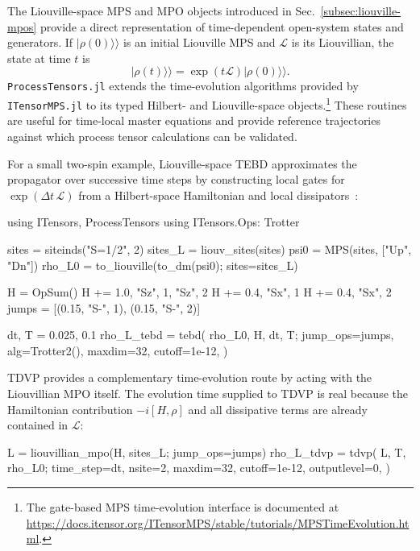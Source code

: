
\label{app:time-dynamics}

The Liouville-space MPS and MPO objects introduced in Sec.~\ref{subsec:liouville-mpos} provide a direct representation of time-dependent open-system states and generators.
If \(\lvert\rho(0)\rangle\!\rangle\) is an initial Liouville MPS and \(\mathcal L\) is its Liouvillian, the state at time \(t\) is
%
\begin{equation}
    \lvert\rho(t)\rangle\!\rangle
    = \exp(t\mathcal L)\lvert\rho(0)\rangle\!\rangle.
    \label{eq:appendix-liouville-time-evolution}
\end{equation}
%
\texttt{ProcessTensors.jl} extends the time-evolution algorithms provided by \texttt{ITensorMPS.jl} to its typed Hilbert- and Liouville-space objects.\footnote{The gate-based MPS time-evolution interface is documented at \url{https://docs.itensor.org/ITensorMPS/stable/tutorials/MPSTimeEvolution.html}.}
These routines are useful for time-local master equations and provide reference trajectories against which process tensor calculations can be validated.

For a small two-spin example, Liouville-space TEBD approximates the propagator over successive time steps by constructing local gates for \(\exp(\Delta t\,\mathcal L)\) from a Hilbert-space Hamiltonian and local dissipators~\cite{Vidal2004,ZwolakVidal2004,Daley2004,WhiteFeiguin2004}:
%
\begin{juliacode}[
  caption={Time evolution of a dissipative Liouville-space state with TEBD.},
  label={lst:appendix-liouville-tebd},
]
using ITensors, ProcessTensors
using ITensors.Ops: Trotter

sites = siteinds("S=1/2", 2)
sites_L = liouv_sites(sites)
psi0 = MPS(sites, ["Up", "Dn"])
rho_L0 = to_liouville(to_dm(psi0); sites=sites_L)

H = OpSum()
H += 1.0, "Sz", 1, "Sz", 2
H += 0.4, "Sx", 1
H += 0.4, "Sx", 2
jumps = [(0.15, "S-", 1), (0.15, "S-", 2)]

dt, T = 0.025, 0.1
rho_L_tebd = tebd(
    rho_L0, H, dt, T;
    jump_ops=jumps,
    alg=Trotter{2}(),
    maxdim=32,
    cutoff=1e-12,
)
\end{juliacode}
%

TDVP provides a complementary time-evolution route by acting with the Liouvillian MPO itself.
The evolution time supplied to TDVP is real because the Hamiltonian contribution \(-i[H,\rho]\) and all dissipative terms are already contained in \(\mathcal L\):
%
\begin{juliacode}[
  caption={Time evolution of the same Liouville-space state with TDVP.},
  label={lst:appendix-liouville-tdvp},
]
L = liouvillian_mpo(H, sites_L; jump_ops=jumps)
rho_L_tdvp = tdvp(
    L, T, rho_L0;
    time_step=dt,
    nsite=2,
    maxdim=32,
    cutoff=1e-12,
    outputlevel=0,
)
\end{juliacode}
%

